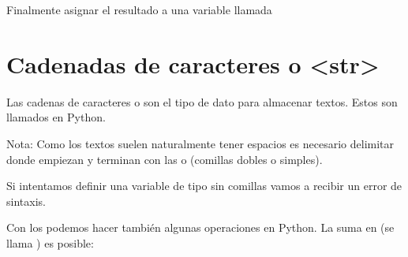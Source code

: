 \documentclass[a4paper,12pt,spanish]{sphinxmanual}
\begin{document}
\sphinxAtStartPar
Finalmente asignar el resultado a una variable llamada 

\sphinxstepscope


\chapter{Cadenadas de caracteres o  \textless{}str\textgreater{}}
\label{\detokenize{str:cadenadas-de-caracteres-o-strings-str}}\label{\detokenize{str::doc}}
\sphinxAtStartPar
Las cadenas de caracteres o  son el tipo de dato para almacenar textos.
Estos son llamados  en Python.

\begin{sphinxVerbatim}[commandchars=\\\{\}]
  
 
\end{sphinxVerbatim}

\sphinxAtStartPar
Nota: Como los textos suelen naturalmente tener espacios es necesario
delimitar donde empiezan y terminan con las  o \sphinxcode{\sphinxupquote{\textquotesingle{}}} (comillas
dobles o simples).

\sphinxAtStartPar
Si intentamos definir una variable de tipo  sin comillas vamos a
recibir un error de sintaxis.

\begin{sphinxVerbatim}[commandchars=\\\{\}]
   
     
       
  
\end{sphinxVerbatim}

\sphinxAtStartPar
Con los  podemos hacer también algunas operaciones en Python.
La suma en  (se llama ) es posible:
\end{document}
